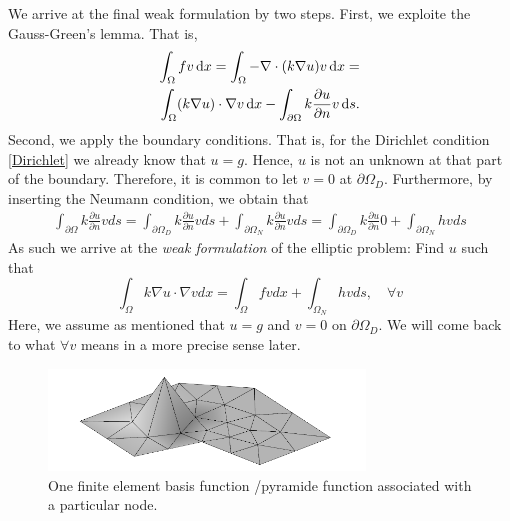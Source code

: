 We arrive at the final weak formulation by two steps. First, we exploite the Gauss-Green's lemma. That is,  
\begin{eqnarray*}
\label{gaussgreen}
\int_\Omega f v \, \mathrm{d}x =   \int_\Omega -\nabla\cdot(k\nabla u) v \, \mathrm{d}x =  \\ 
\int_\Omega (k\nabla u) \cdot \nabla v \, \mathrm{d}x  - \int_{\partial \Omega} k\frac{\partial u} {\partial n} v \, \mathrm{d}s  .  
\end{eqnarray*}
Second, we apply the boundary conditions. That is, for the Dirichlet
condition \eqref{Dirichlet} we already know that $u=g$. Hence, $u$ is not an unknown at that part of the boundary.  Therefore, it is common 
to let $v=0$ at $\partial \Omega_D$. Furthermore, by inserting the Neumann condition, we obtain that  
\begin{eqnarray}
\int_{\partial \Omega} k\frac{\partial u} {\partial n} v ds =   
\int_{\partial \Omega_D} k\frac{\partial u} {\partial n} v ds +   \int_{\partial \Omega_N} k\frac{\partial u} {\partial n} v ds =   
\int_{\partial \Omega_D} k\frac{\partial u} {\partial n} 0 +   \int_{\partial \Omega_N} h v ds   
\end{eqnarray}
As such we arrive at the \emph{weak formulation} of the elliptic problem: 
Find $u$ such that 
\begin{equation}
\label{weakform}
\int_\Omega k \nabla u \cdot \nabla v dx = \int_\Omega f v dx + \int_{\Omega_N} h v ds, \quad \forall v  
\end{equation}
Here, we assume as mentioned that $u=g$ and $v=0$ on $\partial \Omega_D$. We will come back to what $\forall v$ means in a 
more precise sense later.  

\begin{figure}
\begin{center}
\includegraphics[width=0.75\textwidth]{chapters/elliptic/pics/fem.png}
\caption{One finite element basis function /pyramide function associated with a particular node.}
\label{fig:fembasis}
\end{center}
\end{figure}




